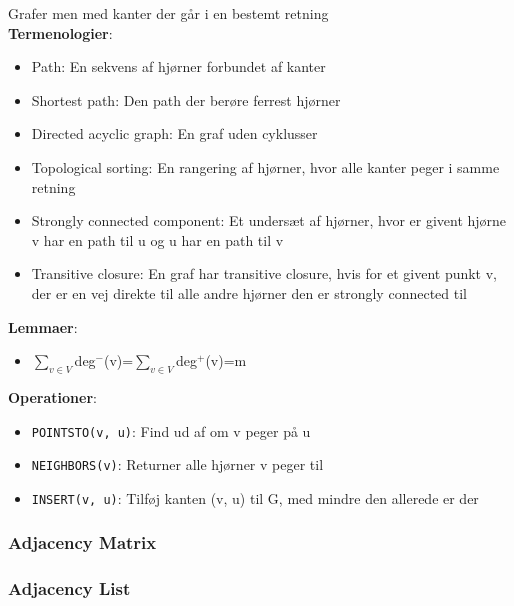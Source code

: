 Grafer men med kanter der går i en bestemt retning\\
\textbf{Termenologier}:
\begin{itemize}
	\item Path: En sekvens af hjørner forbundet af kanter
	\item Shortest path: Den path der berøre ferrest hjørner
	\item Directed acyclic graph: En graf uden cyklusser
	\item Topological sorting: En rangering af hjørner, hvor alle kanter peger i samme retning
	\item Strongly connected component: Et undersæt af hjørner, hvor er givent hjørne v har en path til u og u har en path til v
	\item Transitive closure: En graf har transitive closure, hvis for et givent punkt v, der er en vej direkte til alle andre hjørner den er strongly connected til
\end{itemize}
\textbf{Lemmaer}:
\begin{itemize}
	\item $\sum_{v\in V}$deg$^-$(v)=$\sum_{v\in V}$deg$^+$(v)=m
\end{itemize}
\textbf{Operationer}:
\begin{itemize}
	\item \texttt{POINTSTO(v, u)}: Find ud af om v peger på u
	\item \texttt{NEIGHBORS(v)}: Returner alle hjørner v peger til
	\item \texttt{INSERT(v, u)}: Tilføj kanten (v, u) til G, med mindre den allerede er der
\end{itemize}

\subsubsection{Adjacency Matrix}


\subsubsection{Adjacency List}
